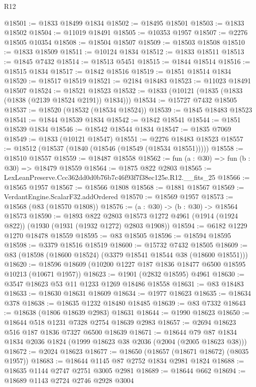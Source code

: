 \begin{lexlean}{R12}
\begin{coremodule}
@18501 := @1833 @18499 @1834
@18502 := @18495 @18501
@18503 := @1833 @18502
@18504 := @11019 @18491
@18505 := @10353 @1957
@18507 := @2276 @18505 @10354
@18508 := @18504 @18507
@18509 := @18503 @18508
@18510 := @1833 @18509
@18511 := @10124 @1834
@18512 := @1833 @18511
@18513 := @1845 @7432
@18514 := @18513 @5451
@18515 := @1844 @18514
@18516 := @18515 @1834
@18517 := @1842 @18516
@18519 := @1851 @18514 @1834
@18520 := @18517 @18519
@18521 := @2184 @18483
@18523 := @11023 @18491 @18507
@18524 := @18521 @18523
@18532 := @1833 (@10121 (@1835 (@1833 (@1838 (@2139 @18524 @2191)) @1834)))
@18534 := @15727 @7432 @18505
@18537 := @18520 (@18532 (@18534 @18524))
@18539 := @1845 @18483 @18523
@18541 := @1844 @18539 @1834
@18542 := @1842 @18541
@18544 := @1851 @18539 @1834
@18546 := @18542 @18544 @1834
@18547 := @1835 @7069
@18549 := @1833 (@10121 @18547)
@18551 := @2276 @18483 @18523
@18557 := @18512 (@18537 (@1840 (@18546 (@18549 (@18534 @18551)))))
@18558 := @18510 @18557
@18559 := @18487 @18558
@18562 := fun (a : @30) => fun (b : @30) => @18479 @18559
@18564 := @1875 @822 @2803
@18565 := LexLeanPreserve.Ccc362dd0d0b76b7c46f93f7f38ec125e.R12.__fits_25
@18566 := @18565 @1957
@18567 := @18566 @1808
@18568 := @1881 @18567
@18569 := VerdantEngine.ScalarF32.addOrdered
@18570 := @18569 @1957
@18573 := @18568 (@83 (@18570 @1808))
@18576 := (a : @30) -> (b : @30) -> @18564 @18573
@18590 := @1893
    @822
    @2803
    @18573
    @1272
    @4961
    (@1914 (@1924 @822))
    (@1930 (@1931 (@1932 @1272) @2803 @1908))
@18594 := @6182 @1229 @1270 @18478 @18559
@18595 := @83 @18505
@18596 := @18594 @18595
@18598 := @3379 @18516 @18519
@18600 := @15732 @7432 @18505
@18609 := @83 (@18598 (@18600 @18524) (@3379 @18541 @18544 @38 (@18600 @18551)))
@18620 := @18596 @18609 (@10200 @1227 @187 @1836 @18477 @6500 @18595 @10213 (@10671 @1957))
@18623 := @1901 (@2832 @18595) @4961
@18630 := @3547 @18623 @53 @11 @1233 @1269 @18486 @18558
@18631 := @83 @18483
@18633 := @18630 @18631 @18609
@18634 := @1977 @18623
@18635 := @18634 @378
@18638 := @18635 @1232 @18480 @18485
@18639 := @83 @7332
@18643 := @18638 (@1806 @18639 @2983) @18631
@18644 := @1990 @18623
@18650 := @18644 @518 @1231 @7328 @2754 @18639 @2983
@18657 := @2694 @18623 @516 @187 @1836 @7327 @6500 @18639
@18671 := @18644 @79 @87 @1834 @1834 @2036 @1824 (@1999 @18623 @38 @2036 (@2004 (@2005 @18623 @38)))
@18672 := @2024 @18623
@18677 := @18650 (@18657 (@18671 @18672) (@8035 @1957))
@18683 := @18644 @1145 @87 @2752 @1834 @2981 @1824
@18688 := @18635 @1144 @2747 @2751 @3005 @2981
@18689 := @18644 @662
@18694 := @18689 @1143 @2724 @2746 @2928 @3004

\end{coremodule}
\end{lexlean}
